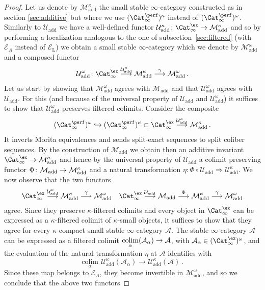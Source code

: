 \documentclass{amsart}
\renewcommand{\to}{\mathchoice{\longrightarrow}{\rightarrow}{\rightarrow}{\rightarrow}}
\newcommand{\cA}{{\mathcal A}}
\newcommand{\cE}{{\mathcal E}}
\newcommand{\cM}{{\mathcal M}}
\newcommand{\cU}{{\mathcal U}}
\renewcommand{\L}{\mathrm{L}}
\newcommand{\stabcat}{\Cat_\i^{\ex}}
\newcommand{\idemstabcat}{\Cat_\i^{\perf}}
\newcommand{\too}{\longrightarrow}%
\renewcommand{\i}{\infty}
\newcommand{\Motadd}{\cM_{\mathrm{add}}}
\newcommand{\Umot}{\cU_{\mathrm{add}}}
\newcommand{\Uadd}{\cU_{\mathrm{add}}}
\numberwithin{equation}{section}
\theoremstyle{definition}
\begin{document}
\begin{proof}
Let us denote by $\Motadd^\kappa$ the small stable $\infty$-category
constructed as in section \ref{sec:additive} but where we use
$(\idemstabcat)^\kappa$ instead of $(\idemstabcat)^\omega$. Similarly
to $\Uadd$ we have a well-defined functor
$\Uadd^\kappa \colon \stabcat \to \Motadd^\kappa$ and so by performing a
localization analogous to the one of subsection~\ref{sec:filtered}
(with $\cE_A$ instead of $\cE_\L$) we obtain a small stable
$\infty$-category which we denote by $\Motadd^\omega$ and a composed
functor  
$$\Uadd^\omega\colon \stabcat \stackrel{\Uadd^\kappa}{\too} \Motadd^\kappa \stackrel{\gamma}{\too} \Motadd^\omega\,.$$ 
Let us start by showing that $\Motadd^\omega$ agrees with $\Motadd$
and that $\Uadd^\omega$ agrees with $\Uadd$. For this (and because of
the universal property of $\Uadd$ and $\Uadd^\omega$) it suffices to
show that $\Uadd^\omega$ preserves filtered colimits. Consider the
composite  
$$
(\idemstabcat)^\omega \hookrightarrow
(\idemstabcat)^\kappa \subset \stabcat \stackrel{\Uadd^\kappa}{\too} \Motadd^\kappa\,.$$ 
It inverts Morita equivalences and sends
split-exact sequences to split cofiber sequences. By the construction
of $\Motadd$ we obtain then an additive invariant
$\stabcat \to \Motadd^\kappa$ and hence by the universal property of
$\Uadd$ a colimit preserving functor
$\Phi \colon \Motadd \to \Motadd^\kappa$ and a natural transformation
$\eta\colon \Phi \circ \Uadd \Rightarrow \Uadd^\kappa$. We 
now observe that the two functors 
\begin{eqnarray*}
\stabcat \stackrel{\Umot^\kappa}{\too} \Motadd^\kappa \stackrel{\gamma}{\too} \Motadd^\omega
&& \stabcat \stackrel{\Umot}{\too} \Motadd \stackrel{\Phi}{\too} \Motadd^\kappa \stackrel{\gamma}{\too} \Motadd^\omega
\end{eqnarray*}
agree. Since they preserve $\kappa$-filtered colimits and every object
in $\stabcat$ can be expressed as a $\kappa$-filtered colimit of
$\kappa$-small objects, it suffices to show that they agree for every
$\kappa$-compact small stable $\infty$-category 
$\cA$.  The stable $\infty$-category $\cA$ can be expressed as a filtered colimit
$\underset{\alpha}{\mathrm{colim}} (\cA_\alpha) \to \cA$, with 
$\cA_\alpha \in (\stabcat)^\omega$, and the evaluation of the
natural transformation $\eta$ at $\cA$ identifies with
$$\underset{\alpha}{\mathrm{colim}}\,\, \Umot^\kappa(\cA_\alpha) \too \Umot^\kappa(\cA)\,.$$ 
Since these map belongs to $\cE_A$, they become invertible in
$\Motadd^\omega$, and so we conclude that the above two functors

\end{proof}
\end{document}
